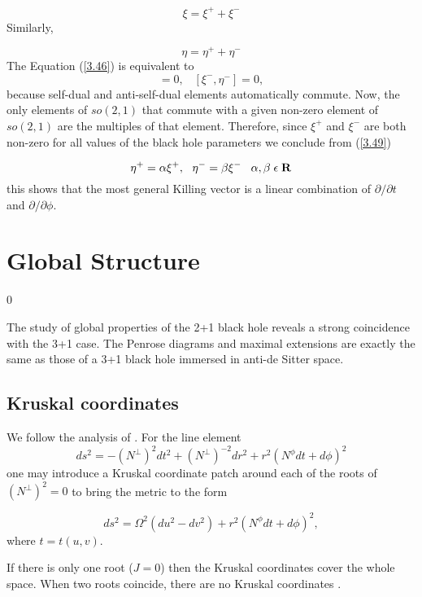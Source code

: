 \documentclass[12pt]{article}
\newcounter{c1} \newcounter{c2}
\newcommand{\bb}{\begin{equation}}
\newcommand{\ee}{\end{equation}}
\begin{document}
\bb
\xi = \xi^+ + \xi^-
\label{3.47}
\end{equation}
%
Similarly,

\bb
\eta = \eta^+ + \eta^-
\label{3.48}
\end{equation}
%
The Equation (\ref{3.46}) is equivalent to
\bb
[\xi^+,\eta^+] = 0, \;\;\; [\xi^-,\eta^-] = 0,
\label{3.49}
\end{equation}
%
because self-dual and anti-self-dual elements automatically commute.
Now, the only elements of $so(2,1)$ that commute with a given non-zero element
of $so(2,1)$ are the multiples of that element. Therefore, since $\xi^+$ and
$\xi^-$ are both non-zero for all values of the black hole parameters we
conclude from (\ref{3.49})

\bb
\eta^+ = \alpha \xi^+, \  \ \eta^- = \beta \xi^- \;\;\;
\alpha, \beta \;\epsilon\;{\bf R}
\label{3.50}
\end{equation}
%
this shows that the most general Killing vector is a linear combination of
$\partial/\partial t$ and $\partial/\partial \phi$.


\section{Global Structure}
\setcounter{equation} 0


The study of global properties of the 2+1 black hole reveals a
strong coincidence with the 3+1 case. The Penrose diagrams and
maximal extensions are exactly the same as those of a 3+1 black
hole immersed in anti-de Sitter space.

\subsection{Kruskal coordinates}


We follow the analysis of \cite{10}. For the line element
\bb
ds^2  = -(N^{\perp})^2 dt^2 + (N^{\perp})^{-2}dr^2 + r^2(N^{\phi}dt + d\phi)^2
\label{4.1}
\end{equation}
%
one may introduce a Kruskal coordinate patch around each of the
roots of $(N^{\perp})^2 =0$ to bring the metric to the form

\bb
ds^2= \Omega^2 (du^2-dv^2) +r^2(N^{\phi}dt + d\phi)^2,
\label{4.2}
\ee
%
where $t=t(u,v)$.

If there is only one root ($J=0$) then the Kruskal coordinates
cover the whole space. When two roots coincide, there are no
Kruskal coordinates \cite{11}.
\end{document}
